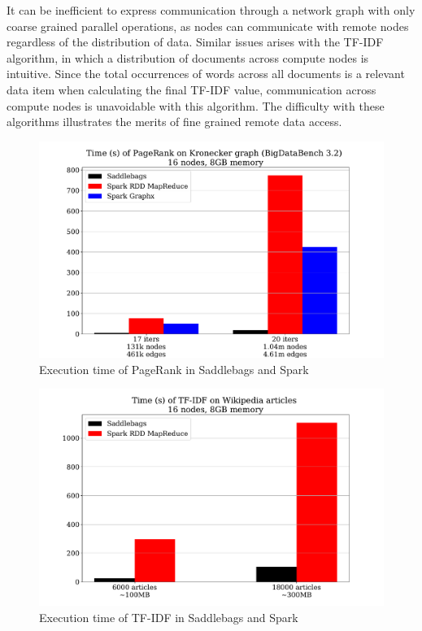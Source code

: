 \documentclass{uit-report}
\begin{document}
It can be inefficient to express communication through a network graph with only coarse grained parallel operations, as nodes can communicate with remote nodes regardless of the distribution of data. Similar issues arises with the TF-IDF algorithm, in which a distribution of documents across compute nodes is intuitive. Since the total occurrences of words across all documents is a relevant data item when calculating the final TF-IDF value, communication across compute nodes is unavoidable with this algorithm. The difficulty with these algorithms illustrates the merits of fine grained remote data access.

\newpage
\begin{figure}[H]
	\centering
	\includegraphics[width=15cm]{illustrations/sparkpagerank.pdf}
	\caption{Execution time of PageRank in Saddlebags and Spark}
	\label{fig:pagerankspark}
\end{figure}

\begin{figure}[H]
	\centering
	\includegraphics[width=15cm]{illustrations/sparktfidf.pdf}
	\caption{Execution time of TF-IDF in Saddlebags and Spark}
	\label{fig:tfidfspark}
\end{figure}
\newpage
\end{document}
